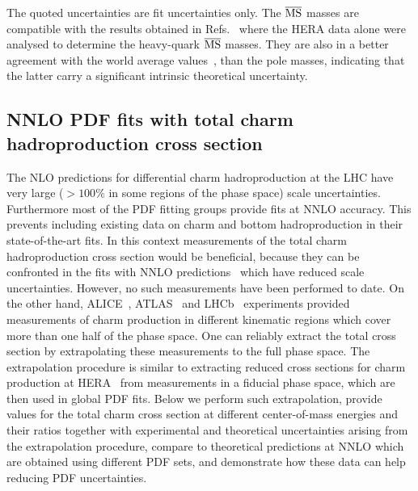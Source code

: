 \documentclass[12pt,a4paper]{article}
\newcommand{\msbar}{\ensuremath{\overline{\rm MS}}\xspace}
\begin{document}
The quoted uncertainties are fit uncertainties only.
The \msbar masses are compatible with the results obtained in Refs.~\cite{Abramowicz:1900rp,Abramowicz:2014zub,Bertone:2016ywq,H1:2018flt} where the HERA data alone were analysed to determine the heavy-quark \msbar masses. They are also in a better agreement with the world average values~\cite{Tanabashi:2018oca}, than the pole masses, indicating that the latter carry a significant intrinsic theoretical uncertainty.

\subsection{NNLO PDF fits with total charm hadroproduction cross section}
The NLO predictions for differential charm hadroproduction at the LHC have very large ($>100\%$ in some regions of the phase space) scale uncertainties. Furthermore most of the PDF fitting groups provide fits at NNLO accuracy. This prevents including existing data on charm and bottom hadroproduction in their state-of-the-art fits. In this context measurements of the total charm hadroproduction cross section would be beneficial, because they can be confronted in the fits with NNLO predictions~\cite{Baernreuther:2012ws,Czakon:2012zr,Czakon:2012pz,Czakon:2013goa} which have reduced scale uncertainties. However, no such measurements have been performed to date. On the other hand, ALICE~\cite{Acharya:2017jgo,Acharya:2019mgn}, ATLAS~\cite{Aad:2015zix} and LHCb~\cite{Aaij:2013mga,Aaij:2015bpa,Aaij:2016jht} experiments provided measurements of charm production in different kinematic regions which cover more than one half of the phase space. One can reliably extract the total cross section by extrapolating these measurements to the full phase space. The extrapolation procedure is similar to extracting reduced cross sections for charm production at HERA~\cite{H1:2018flt} from measurements in a fiducial phase space, which are then used in global PDF fits. Below we perform such extrapolation, provide values for the total charm cross section at different center-of-mass energies and their ratios together with experimental and theoretical uncertainties arising from the extrapolation procedure, compare to theoretical predictions at NNLO which are obtained using different PDF sets, and demonstrate how these data can help reducing PDF uncertainties.
\end{document}
